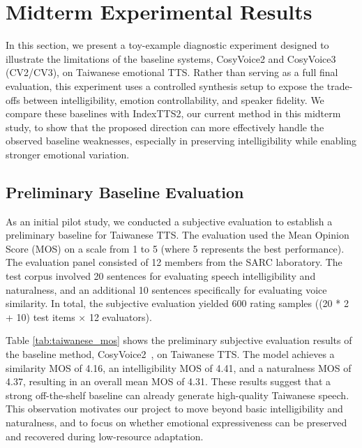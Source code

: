 \section{Midterm Experimental Results}
\label{section:exp}

In this section, we present a toy-example diagnostic experiment designed to illustrate the limitations of the baseline systems, CosyVoice2 and CosyVoice3 (CV2/CV3), on Taiwanese emotional TTS. Rather than serving as a full final evaluation, this experiment uses a controlled synthesis setup to expose the trade-offs between intelligibility, emotion controllability, and speaker fidelity. We compare these baselines with IndexTTS2, our current method in this midterm study, to show that the proposed direction can more effectively handle the observed baseline weaknesses, especially in preserving intelligibility while enabling stronger emotional variation.

\subsection{Preliminary Baseline Evaluation}
\label{section:exp:setup}
\label{section:exp:baseline}
As an initial pilot study, we conducted a subjective evaluation to establish a preliminary baseline for Taiwanese TTS. The evaluation used the Mean Opinion Score (MOS) on a scale from 1 to 5 (where 5 represents the best performance). The evaluation panel consisted of 12 members from the SARC laboratory. The test corpus involved 20 sentences for evaluating speech intelligibility and naturalness, and an additional 10 sentences specifically for evaluating voice similarity. In total, the subjective evaluation yielded 600 rating samples ((20 * 2 + 10) test items $\times$ 12 evaluators).

Table \ref{tab:taiwanese_mos} shows the preliminary subjective evaluation results of the baseline method, CosyVoice2~\citep{Du2024CosyVoice2S}, on Taiwanese TTS. The model achieves a similarity MOS of 4.16, an intelligibility MOS of 4.41, and a naturalness MOS of 4.37, resulting in an overall mean MOS of 4.31. These results suggest that a strong off-the-shelf baseline can already generate high-quality Taiwanese speech. This observation motivates our project to move beyond basic intelligibility and naturalness, and to focus on whether emotional expressiveness can be preserved and recovered during low-resource adaptation.

